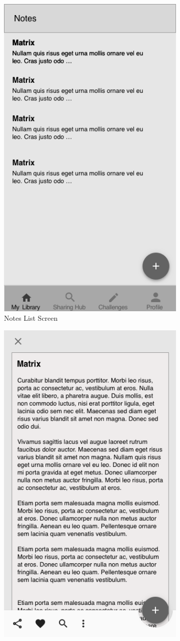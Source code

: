 \documentclass[thesis=B,english]{FITthesis}[2012/10/20]
\begin{document}
\begin{figure}
\begin{subfigure}{.5\textwidth}
  \includegraphics[scale=0.4]{Notes}
  \caption{Notes List Screen}
  \label{fig:notes}
\end{subfigure}
\begin{subfigure}{.5\textwidth}
  \centering
  \includegraphics[scale=0.4]{NoteDetailView}

\end{subfigure}
\end{figure}
\end{document}
